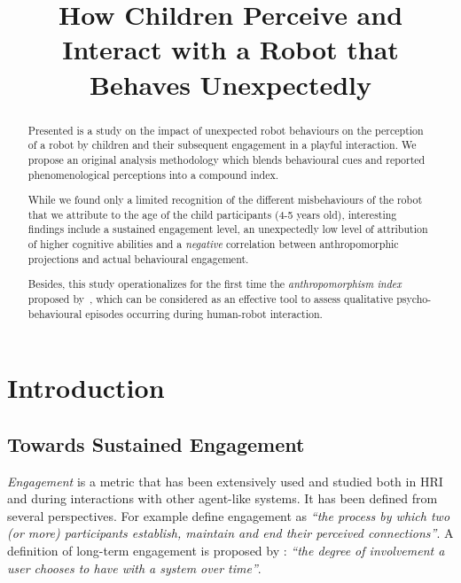 \documentclass{sig-alternate}
\title{\LARGE \bf
How Children Perceive and Interact with a Robot that Behaves Unexpectedly
}
\begin{document}
\sloppy %
\maketitle
\begin{abstract}

Presented is a study on the impact of unexpected robot behaviours on the
perception of a robot by children and their subsequent engagement in a playful interaction.
We propose an original analysis methodology which blends behavioural cues and
reported phenomenological perceptions into a compound index.

While we found only a limited recognition of the different misbehaviours of the
robot that we attribute to the age of the child participants (4-5 years old),
interesting findings include a sustained engagement level, an unexpectedly low
level of attribution of higher cognitive abilities and a \emph{negative}
correlation between anthropomorphic projections and actual behavioural
engagement.

Besides, this study operationalizes for the first time the
\emph{anthropomorphism index} proposed by~\cite{fink2014dynamics}, which can be
considered as an effective tool to assess qualitative psycho-behavioural
episodes occurring during human-robot interaction.

\end{abstract}
\section{Introduction}
\subsection{Towards Sustained Engagement}

\emph{Engagement} is a metric that has been extensively used and studied both
in HRI and during interactions with other agent-like systems. It has been
defined from several perspectives. For example \cite{sidner_where_2004} define
engagement as \textit{``the process by which two (or more) participants
establish, maintain and end their perceived connections''}. A definition of
long-term engagement is proposed by \cite{bickmore_maintaining_2010}:
\textit{``the degree of involvement a user chooses to have with a system over
time''}.
\end{document}

